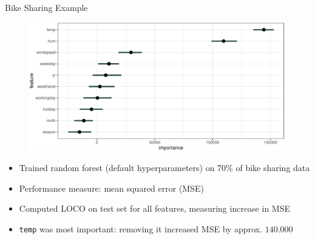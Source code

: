 \documentclass[11pt,compress,t,notes=noshow, aspectratio=169, xcolor=table]{beamer}
\begin{document}
\begin{frame}{Bike Sharing Example}
%
\begin{figure}
  \centering
  \includegraphics[width=\textwidth]{figure_man/bike_sharing_loco.pdf}
\end{figure}
%
%
\begin{itemize}
  \item Trained random forest (default hyperparameters) on 70\% of bike sharing data
  \item Performance measure: mean squared error (MSE)
  \item Computed LOCO on test set for all features, measuring increase in MSE
  \item \texttt{temp} was most important: removing it increased MSE by approx. $140.000$
\end{itemize}

\end{frame}
\end{document}
